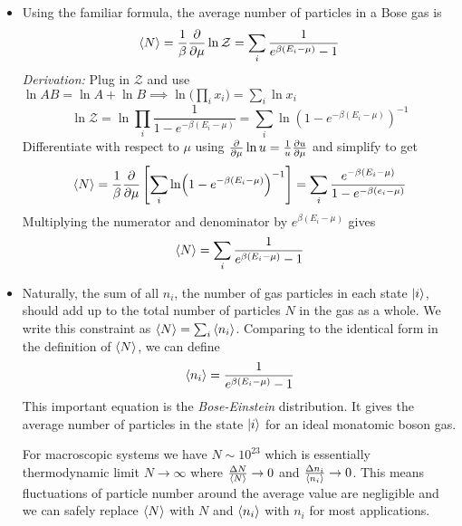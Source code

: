 \documentclass[11pt, a4paper]{article}
\begin{document}
\begin{itemize}
	\item Using the familiar formula, the average number of particles in a Bose gas is
	\begin{equation*}
		\expval{N} = \frac{1}{\beta} \pdv{}{\mu} \ln \mathcal{Z} = \sum_{i}\frac{1}{e^{\beta(E_{i} - \mu)} - 1}
	\end{equation*}
	\textit{Derivation:} Plug in $ \mathcal{Z} $ and use $ \ln AB = \ln A + \ln B \implies  \ln \big(\prod_{i}x_{i} \big)= \sum_{i} \ln x_{i} $
	\begin{equation*}
		\ln \mathcal{Z} = \ln \prod_{i} \frac{1}{1 - e^{-\beta (E_{i} - \mu)}} = \sum_{i} \ln (1 - e^{-\beta (E_{i} - \mu)})^{-1}
	\end{equation*} 
	Differentiate with respect to $ \mu $ using $ \pdv{}{\mu}\ln u = \frac{1}{u} \pdv{u}{\mu} $ and simplify to get
	\begin{align*}
		\expval{N} = \frac{1}{\beta} \pdv{}{\mu} \left[\sum_{i} \ln (1 - e^{-\beta (E_{i} - \mu)})^{-1}\right] = \sum_{i} \frac{e^{-\beta(E_{i} - \mu)}}{1 - e^{-\beta(e_{i} - \mu)}}
	\end{align*}
	Multiplying the numerator and denominator by $ e^{\beta(E_{i} - \mu)} $ gives
	\begin{equation*}
		\expval{N} = \sum_{i}\frac{1}{e^{\beta(E_{i} - \mu)} - 1}
	\end{equation*}
	
	\item Naturally, the sum of all $ n_{i} $, the number of gas particles in each state $ \ket{i} $, should add up to the total number of particles $ N $ in the gas as a whole. We write this constraint as $ \expval{N} = \sum_{i}\expval{n_{i}} $. Comparing to the identical form in the definition of $ \expval{N} $, we can define
	\begin{equation*}
		\expval{n_{i}} = \frac{1}{e^{\beta(E_{i} - \mu)} - 1}
	\end{equation*}
	This important equation is the \textit{Bose-Einstein} distribution. It gives the average number of particles in the state $ \ket{i} $ for an ideal monatomic boson gas. 
	
	
	For macroscopic systems we have $ N \sim 10^{23} $ which is essentially thermodynamic limit $ N \to \infty $ where $ \frac{\Delta N}{\expval{N}} \to 0$ and $ \frac{\Delta n_{i}}{\expval{n_{i}}} \to 0 $. This means fluctuations of particle number around the average value are negligible and we can safely replace $ \expval{N} $ with $ N $ and $ \expval{n_{i}} $ with $ n_{i} $ for most applications.
	

\end{itemize}
\end{document}

